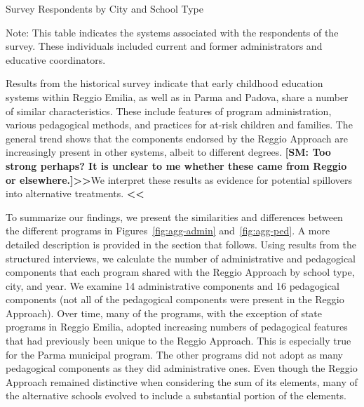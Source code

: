 \begin{table}[H]
\centering
\caption{Survey Respondents by City and School Type}\label{tab:respondents}
\begin{threeparttable}
	
\begin{tablenotes}
Note: This table indicates the systems associated with the respondents of the survey. These individuals included current and former administrators and educative coordinators.
\end{tablenotes}
\end{threeparttable}
\end{table}

Results from the historical survey indicate that early childhood education systems within Reggio Emilia, as well as in Parma and Padova, share a number of similar characteristics. These include features of program administration, various pedagogical methods, and practices for at-risk children and families. The general trend shows that the components endorsed by the Reggio Approach are increasingly present in other systems, albeit to different degrees. \textbf{[SM: Too strong perhaps? It is unclear to me whether these came from Reggio or elsewhere.]>>}We interpret these results as evidence for potential spillovers into alternative treatments. \textbf{<<}

To summarize our findings, we present the similarities and differences between the different programs in Figures~\ref{fig:agg-admin} and~\ref{fig:agg-ped}. A more detailed description is provided in the section that follows. Using results from the structured interviews, we calculate the number of administrative and pedagogical components that each program shared with the Reggio Approach by school type, city, and year. We examine 14 administrative components and 16 pedagogical components (not all of the pedagogical components were present in the Reggio Approach). Over time, many of the programs, with the exception of state programs in Reggio Emilia, adopted increasing numbers of pedagogical features that had previously been unique to the Reggio Approach. This is especially true for the Parma municipal program. The other programs did not adopt as many pedagogical components as they did administrative ones. Even though the Reggio Approach remained distinctive when considering the sum of its elements, many of the alternative schools evolved to include a substantial portion of the elements.

